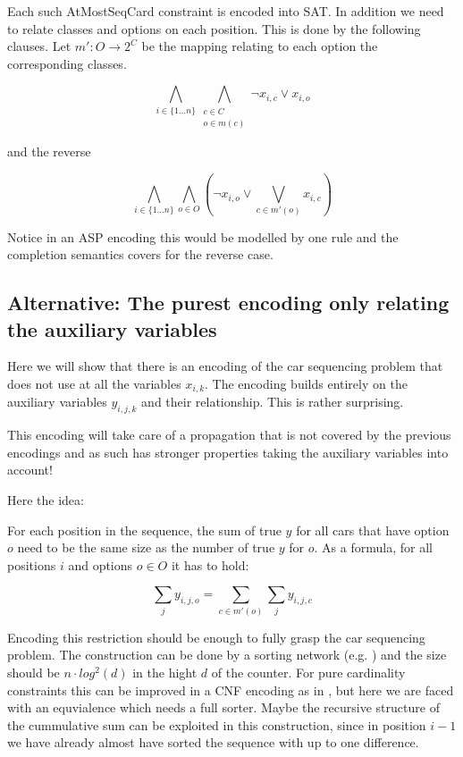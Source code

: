 \documentclass[]{llncs}
\newcommand{\TODO}[1]{ {\color{red}{#1} }}
\newcommand{\AtMostSeqCard}{AtMostSeqCard }
\begin{document}
Each such \AtMostSeqCard constraint is encoded into SAT. In addition we
need to relate classes and options on each position. This is done by the
following clauses.  Let $m':O \rightarrow 2^C$ be the mapping relating
to each option the corresponding classes. 

\begin{equation}
    \bigwedge_{i\in \{1\ldots n\}} \bigwedge_{\substack{c \in C \\ o \in m(c)}} \neg x_{i,c} \vee x_{i,o}
\end{equation}

and the reverse

\begin{equation}
    \bigwedge_{i \in \{1\dots n\}} \bigwedge_{o\in O} \left(\neg x_{i,o} \vee
    \bigvee_{c \in m'(o)} x_{i,c}\right)
\end{equation}

Notice in an ASP encoding this would be modelled by one rule and the
completion semantics covers for the reverse case. 

\subsection{Alternative: The purest encoding only relating the auxiliary variables}

Here we will show that there is an encoding of the car sequencing
problem that does not use at all the variables $x_{i,k}$. The encoding
builds entirely on the auxiliary variables $y_{i,j,k}$ and their
relationship. This is rather surprising. 

This encoding will take care of a propagation that is not covered by the
previous encodings and as such has stronger properties taking the
auxiliary variables into account! \TODO{give example which propagation
is missing}

Here the idea: 

For each position in the sequence, the
sum of true $y$ for all cars that have option $o$ need to be the same
size as the number of true $y$ for $o$. As a formula, for all positions
$i$ and options $ o \in O$ it has to hold: 

$$ \sum_{j} y_{i,j,o} = \sum_{c \in m'(o)} \sum_j y_{i,j,c} $$

Encoding this restriction should be enough to fully grasp the car
sequencing problem. The construction can be done by a sorting network
(e.g. \cite{Batcher68}) and the size should be $n\cdot log^2 (d) $ in the
hight $d$ of the counter. For pure cardinality constraints this can be
improved in a CNF encoding as in \cite{Asin11,Codish10}, but here we are faced
with an equvialence which needs a full sorter. Maybe the recursive
structure of the cummulative sum can be exploited in this construction,
since in position $i-1$ we have already almost  have sorted the sequence
with up to one difference. 
\end{document}
